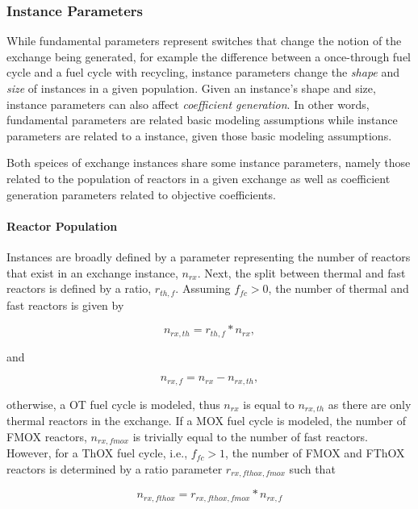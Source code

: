 \subsubsection{Instance Parameters}

While fundamental parameters represent switches that change the notion of the
exchange being generated, for example the difference between a once-through fuel
cycle and a fuel cycle with recycling, instance parameters change the
\textit{shape} and \textit{size} of instances in a given population. Given an
instance's shape and size, instance parameters can also affect
\textit{coefficient generation}. In other words, fundamental parameters are
related basic modeling assumptions while instance parameters are related to a
instance, given those basic modeling assumptions.

Both speices of exchange instances share some instance parameters, namely those
related to the population of reactors in a given exchange as well as coefficient
generation parameters related to objective coefficients. 

\paragraph{Reactor Population}

Instances are broadly defined by a parameter representing the number of reactors
that exist in an exchange instance, $n_{rx}$. Next, the split between thermal
and fast reactors is defined by a ratio, $r_{th, f}$. Assuming $f_{fc} > 0$, the
number of thermal and fast reactors is given by

\begin{equation}
n_{rx, th} = r_{th, f} * n_{rx},
\end{equation}

and 

\begin{equation}
n_{rx, f} = n_{rx} - n_{rx, th},
\end{equation}

otherwise, a OT fuel cycle is modeled, thus $n_{rx}$ is equal to $n_{rx, th}$ as
there are only thermal reactors in the exchange. If a MOX fuel cycle is modeled,
the number of FMOX reactors, $n_{rx, fmox}$ is trivially equal to the number of
fast reactors. However, for a ThOX fuel cycle, i.e., $f_{fc} > 1$, the number of
FMOX and FThOX reactors is determined by a ratio parameter $r_{rx, fthox, fmox}$
such that 

\begin{equation}
n_{rx, fthox} = r_{rx, fthox, fmox} * n_{rx, f}
\end{equation}

